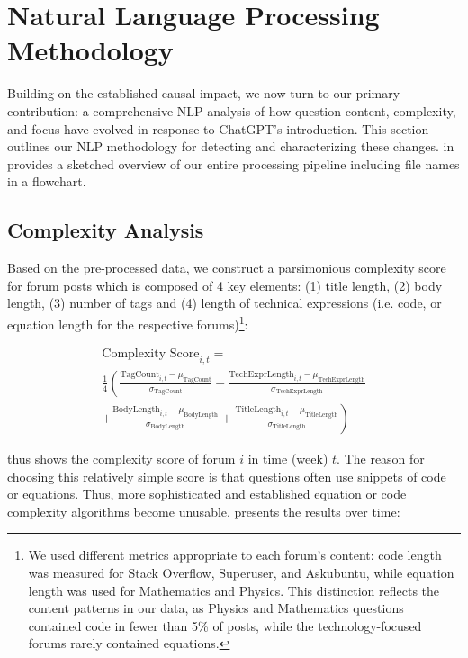 \section{Natural Language Processing Methodology}
\label{sec:nlp_methodology}

Building on the established causal impact, we now turn to our primary contribution: a comprehensive NLP analysis of how question content, complexity, and focus have evolved in response to ChatGPT's introduction. This section outlines our NLP methodology for detecting and characterizing these changes.  in  provides a sketched overview of our entire processing pipeline including file names in a flowchart.


\subsection{Complexity Analysis}

Based on the pre-processed data, we construct a parsimonious complexity score for forum posts which is composed of 4 key elements: (1) title length, (2) body length, (3) number of tags and (4) length of technical expressions (i.e. code, or equation length for the respective forums)\footnote{We used different metrics appropriate to each forum's content: code length was measured for Stack Overflow, Superuser, and Askubuntu, while equation length was used for Mathematics and Physics. This distinction reflects the content patterns in our data, as Physics and Mathematics questions contained code in fewer than 5\% of posts, while the technology-focused forums rarely contained equations.}:

\begin{multline}\label{eq:cscore}
    \text{Complexity Score}_{i,t} = \\ 
    \frac{1}{4} \left( \frac{\text{TagCount}_{i,t} - \mu_{\text{TagCount}}}{\sigma_{\text{TagCount}}} + \frac{\text{TechExprLength}_{i,t} - \mu_{\text{TechExprLength}}}{\sigma_{\text{TechExprLength}}} \right. \\
    \left. + \frac{\text{BodyLength}_{i,t} - \mu_{\text{BodyLength}}}{\sigma_{\text{BodyLength}}} + \frac{\text{TitleLength}_{i,t} - \mu_{\text{TitleLength}}}{\sigma_{\text{TitleLength}}} \right)
\end{multline}

 thus shows the complexity score of forum $i$ in time (week) $t$. The reason for choosing this relatively simple score is that questions often use snippets of code or equations. Thus, more sophisticated and established equation or code complexity algorithms become unusable.  presents the results over time:

